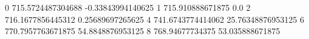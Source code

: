 0 715.5724487304688 -0.33843994140625
1 715.910888671875 0.0
2 716.1677856445312 0.25689697265625
4 741.6743774414062 25.76348876953125
6 770.7957763671875 54.8848876953125
8 768.94677734375 53.035888671875
